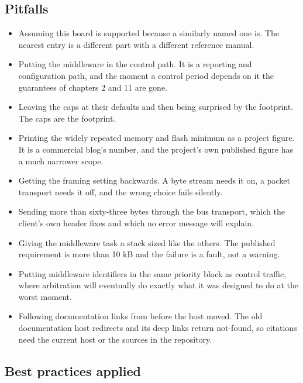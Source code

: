 \subsection*{Pitfalls}

\begin{itemize}
\item Assuming this board is supported because a similarly named one is. The
nearest entry is a different part with a different reference manual.
\item Putting the middleware in the control path. It is a reporting and
configuration path, and the moment a control period depends on it the guarantees
of chapters 2 and 11 are gone.
\item Leaving the caps at their defaults and then being surprised by the
footprint. The caps are the footprint.
\item Printing the widely repeated memory and flash minimum as a project figure.
It is a commercial blog's number, and the project's own published figure has a
much narrower scope.
\item Getting the framing setting backwards. A byte stream needs it on, a packet
transport needs it off, and the wrong choice fails silently.
\item Sending more than sixty-three bytes through the bus transport, which the
client's own header fixes and which no error message will explain.
\item Giving the middleware task a stack sized like the others. The published
requirement is more than 10 kB and the failure is a fault, not a warning.
\item Putting middleware identifiers in the same priority block as control
traffic, where arbitration will eventually do exactly what it was designed to do
at the worst moment.
\item Following documentation links from before the host moved. The old
documentation host redirects and its deep links return not-found, so citations
need the current host or the sources in the repository.
\end{itemize}

\subsection*{Best practices applied}

